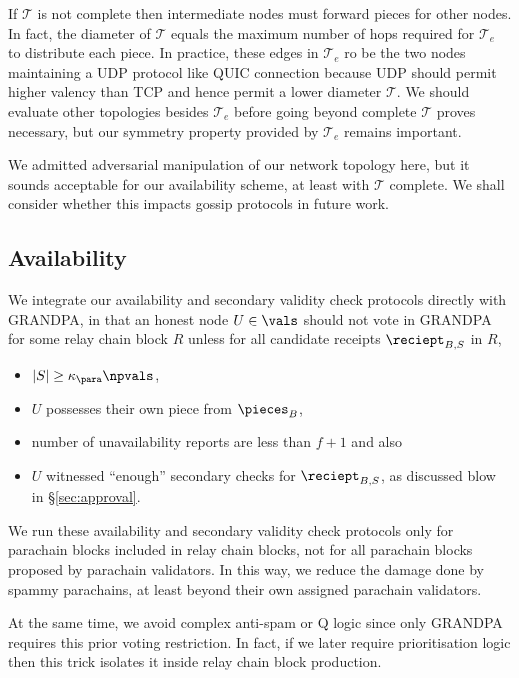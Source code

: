 If $\mathcal{T}$ is not complete then intermediate nodes must forward pieces for other nodes.  In fact, the diameter of $\mathcal{T}$ equals the maximum number of hops required for $\mathcal{T}_e$ to distribute each piece.  
In practice, these edges in $\mathcal{T}_e$ ro be the two nodes
maintaining a UDP protocol like QUIC connection because UDP should permit higher valency than TCP and hence permit a lower diameter $\mathcal{T}$.  
We should evaluate other topologies besides $\mathcal{T}_e$ before going beyond complete $\mathcal{T}$ proves necessary, but our symmetry property provided by $\mathcal{T}_e$ remains important. 

We admitted adversarial manipulation of our network topology here, but it sounds acceptable for our availability scheme, at least with $\mathcal{T}$ complete.  We shall consider whether this impacts gossip protocols in future work. 


\subsection{Availability} %
\label{sec:availability}

We integrate our availability and secondary validity check protocols directly with GRANDPA, in that an honest node $U \in \vals$ should not vote in GRANDPA for some relay chain block $R$ unless for all candidate receipts $\reciept_{B,S}$ in $R$,
\begin{itemize}
\item $|S| \geq \kappa_\para \npvals$,
\item $U$ possesses their own piece from $\pieces_B$,
\item number of unavailability reports are less than  $f+1$ and also
\item $U$ witnessed ``enough'' secondary checks for $\reciept_{B,S}$,
 as discussed blow in \S\ref{sec:approval}.
\end{itemize}

We run these availability and secondary validity check protocols only for parachain blocks included in relay chain blocks, not for all parachain blocks proposed by parachain validators.  In this way, we reduce the damage done by spammy parachains, at least beyond their own assigned parachain validators.

At the same time, we avoid complex anti-spam or Q logic since only GRANDPA requires this prior voting restriction.  In fact, if we later require prioritisation logic then this trick isolates it inside relay chain block production.

